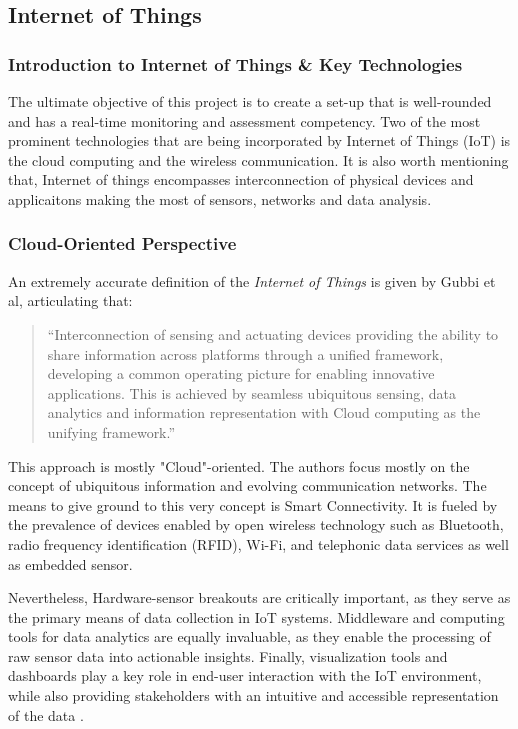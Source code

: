 \subsection{Internet of Things} 
{
	\subsubsection{Introduction to Internet of Things \& Key Technologies}
	{
		The ultimate objective of this project is to create a set-up that is well-rounded and has a real-time monitoring and assessment competency. Two of the most prominent technologies that are being incorporated by Internet of Things (IoT) is the cloud computing and the wireless communication. It is also worth mentioning that, Internet of things encompasses interconnection of physical devices and applicaitons making the most of sensors, networks and data analysis. 
	}
	
	\subsubsection{Cloud-Oriented Perspective \cite{Gubbi2013}}
	{
		An extremely accurate definition of the \textit{Internet of Things} is given by Gubbi et al, articulating that:
		
		\begin{quote}
			``Interconnection of sensing and actuating devices providing the ability to share information across platforms through a unified framework, developing a common operating picture for enabling innovative applications. This is achieved by seamless ubiquitous sensing, data analytics and information representation with Cloud computing as the unifying framework.''
		\end{quote}
		
		This approach is mostly "Cloud"-oriented. The authors focus mostly on the concept of ubiquitous information and evolving communication networks. The means to give ground to this very concept is Smart Connectivity. It is fueled by the prevalence of devices enabled by open wireless technology such as Bluetooth, radio frequency identification (RFID), Wi-Fi, and telephonic data services as well as embedded sensor.
		
		Nevertheless, Hardware-sensor breakouts are critically important, as they serve as the primary means of data collection in IoT systems. Middleware and computing tools for data analytics are equally invaluable, as they enable the processing of raw sensor data into actionable insights. Finally, visualization tools and dashboards play a key role in end-user interaction with the IoT environment, while also providing stakeholders with an intuitive and accessible representation of the data \cite{Gubbi2013}.
	}
	
}
